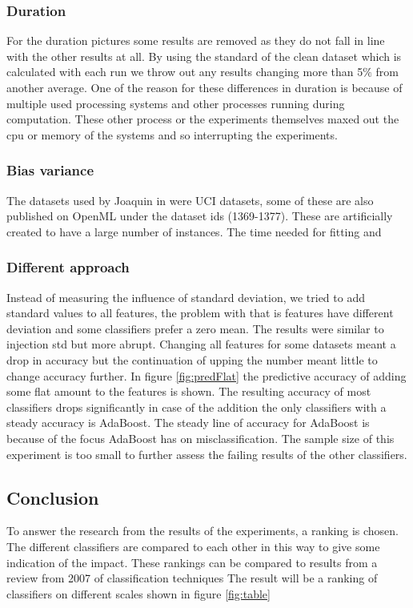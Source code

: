 \documentclass[a4paper,10pt]{article}
\begin{document}
\subsubsection{Duration}
For the duration pictures some results are removed as they do not fall in line with the other results at all. By using the standard of the clean dataset which is calculated with each run we throw out any results changing more than 5$\%$ from another average. One of the reason for these differences in duration is because of multiple used processing systems and other processes running during computation. These other process or the experiments themselves maxed out the cpu or memory of the systems and so interrupting the experiments.

\subsubsection{Bias variance}
The datasets used by Joaquin in \cite{Bias-var} were UCI datasets, some of these are also published on OpenML under the dataset ids (1369-1377). These are artificially created to have a large number of instances. The time needed for fitting and %


\subsubsection{Different approach}
Instead of measuring the influence of standard deviation, we tried to add standard values to all features, the problem with that is features have different deviation and some classifiers prefer a zero mean. The results were similar to injection std but more abrupt. Changing all features for some datasets meant a drop in accuracy but the continuation of upping the number meant little to change accuracy further. In figure \ref{fig:predFlat} the predictive accuracy of adding some flat amount to the features is shown. The resulting accuracy of most classifiers drops significantly in case of the addition the only classifiers with a steady accuracy is AdaBoost. The steady line of accuracy for AdaBoost is because of the focus AdaBoost has on misclassification. The sample size of this experiment is too small to further assess the failing results of the other classifiers.  


\subsection{Conclusion}
To answer the research from the results of the experiments, a ranking is chosen. The different classifiers are compared to each other in this way to give some indication of the impact.
These rankings can be compared to results from a review from 2007 of classification techniques \cite{RevClass}
The result will be a ranking of classifiers on different scales shown in figure \ref{fig:table}
\end{document}

